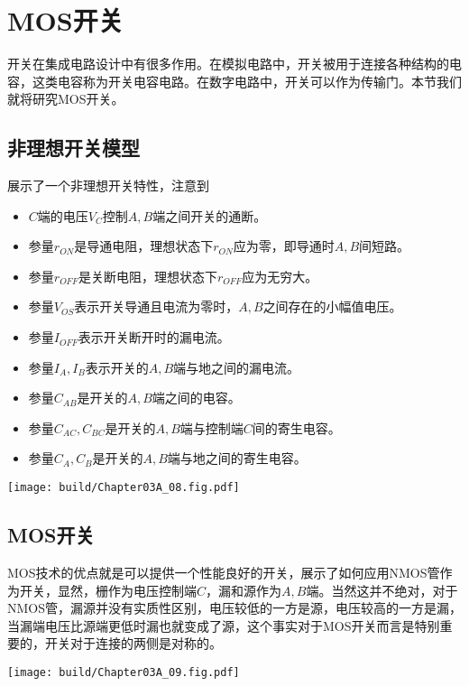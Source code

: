 \section{MOS开关}

开关在集成电路设计中有很多作用。在模拟电路中，开关被用于连接各种结构的电容，这类电容称为开关电容电路。在数字电路中，开关可以作为传输门。本节我们就将研究MOS开关。

\subsection{非理想开关模型}
展示了一个非理想开关特性，注意到
\begin{itemize}
    \item $C$端的电压$V_C$控制$A,B$端之间开关的通断。
    \item 参量$r_{ON}$是导通电阻，理想状态下$r_{ON}$应为零，即导通时$A,B$间短路。
    \item 参量$r_{OFF}$是关断电阻，理想状态下$r_{OFF}$应为无穷大。
    \item 参量$V_{OS}$表示开关导通且电流为零时，$A,B$之间存在的小幅值电压。
    \item 参量$I_{OFF}$表示开关断开时的漏电流。
    \item 参量$I_A,I_B$表示开关的$A,B$端与地之间的漏电流。
    \item 参量$C_{AB}$是开关的$A,B$端之间的电容。
    \item 参量$C_{AC},C_{BC}$是开关的$A,B$端与控制端$C$间的寄生电容。
    \item 参量$C_{A},C_{B}$是开关的$A,B$端与地之间的寄生电容。
\end{itemize}
\begin{Figure}[非理想开关模型]
    \texttt{[image: build/Chapter03A\_08.fig.pdf]}
\end{Figure}

\subsection{MOS开关}

MOS技术的优点就是可以提供一个性能良好的开关，展示了如何应用NMOS管作为开关，显然，栅作为电压控制端$C$，漏和源作为$A,B$端。当然这并不绝对，对于NMOS管，漏源并没有实质性区别，电压较低的一方是源，电压较高的一方是漏，当漏端电压比源端更低时漏也就变成了源，这个事实对于MOS开关而言是特别重要的，开关对于连接的两侧是对称的。
\begin{Figure}[MOS开关]
    \texttt{[image: build/Chapter03A\_09.fig.pdf]}
\end{Figure}

